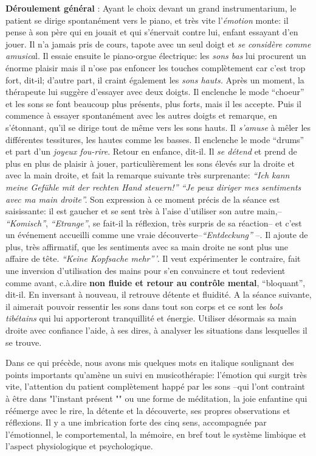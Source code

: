 \textbf{Déroulement général} :
Ayant le choix devant un grand instrumentarium,
le patient se dirige spontanément vers le piano, et très vite
l'\textit{émotion} monte: il pense à son père qui en jouait et qui
s'énervait contre lui, enfant essayant d'en
jouer. Il n'a jamais pris de cours, tapote avec un seul doigt et \textit{se considère comme
	amusica}l. Il essaie ensuite le piano-orgue  électrique: les \textit{sons bas}
lui procurent un énorme plaisir mais il n'ose pas enfoncer les touches
complètement car c'est trop fort, dit-il; d'autre part, il
craint également les
\textit{sons hauts.}
Après un moment, la thérapeute lui suggère d'essayer avec deux doigts.
Il enclenche le mode ``choeur'' et les sons se font beaucoup
plus présents, plus forts, mais il les accepte. Puis il commence à essayer spontanément
avec les autres doigts et remarque,  en s'étonnant, qu'il se
dirige tout de même vers les sons
hauts. Il \textit{s'amuse} à mêler les différentes tessitures,
les hautes comme les basses.
Il enclenche le mode ``drums'' et part d'un\textit{ joyeux
	fou-rire}. Retour en enfance, dit-il.
Il \textit{se détend} et prend de plus en plus de plaisir à jouer, particulièrement  les sons élevés
sur la droite et avec la main droite, et fait
la remarque suivante très surprenante:
\textit{``Ich kann meine Gefühle mit der rechten Hand steuern!''
	``Je peux diriger mes sentiments avec ma main droite''.}
Son expression à ce moment précis de la séance est saisissante: il
est gaucher et se sent très à l'aise d'utiliser son autre
main,-- \textit{``Komisch''},  \textit{``Etrange''}, se fait-il
la réflexion, très surpris de sa réaction-- et c'est un événement
accueilli comme une vraie
découverte--\textit{``Entdeckung''} --.
Il ajoute de plus, très affirmatif, que les sentiments avec sa main
droite ne sont plus une affaire de tête. \textit{``Keine
	Kopfsache mehr'''}. Il veut expérimenter le contraire, fait
une inversion d'utilisation des mains pour s'en convaincre et tout redevient comme
avant, c.à.dire \textbf{non fluide et retour au contrôle
	mental},
``bloquant'', dit-il. En inversant à nouveau, il retrouve
détente et fluidité.
A la séance suivante, il aimerait pouvoir ressentir
les sons dans tout son corps et ce sont les\textit{ bols
	tibétains } qui lui
apporteront tranquillité et
énergie. Utiliser désormais sa main
droite avec confiance l'aide, à ses dires, à analyser les
situations dans lesquelles il se trouve.


Dans ce qui précède, nous avons mis quelques mots en italique soulignant des  points
importants qu'amè\-ne un suivi en musicothérapie: l'émotion qui surgit très
vite,
l'attention du patient complètement happé par les sons --qui l'ont
contraint à être dans "l'instant présent "" ou une forme de méditation, la joie
enfantine qui réémerge avec le rire, la détente et la découverte,
ses propres observations et réflexions.
Il y a une imbrication forte des cinq sens, accompagnée par l'émotionnel, le comportemental, la
mémoire, en bref tout le système limbique et l'aspect
physiologique et psychologique.

